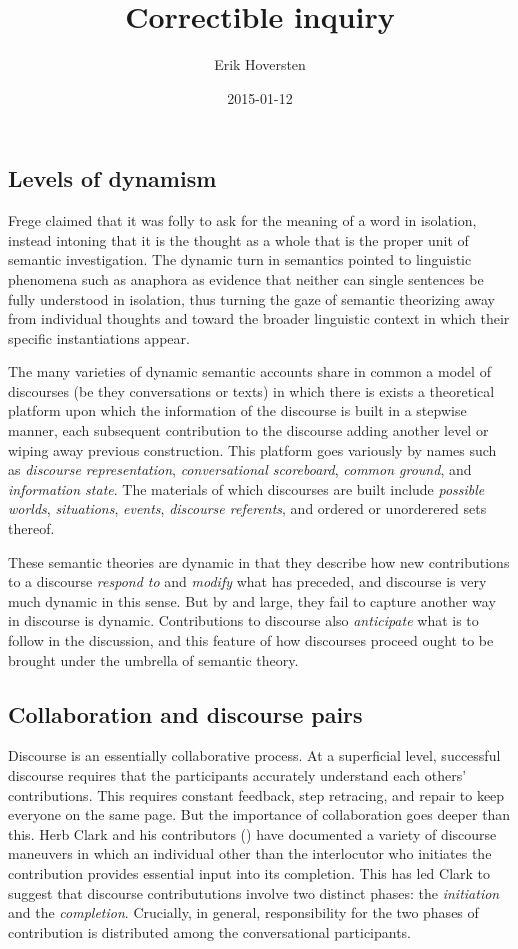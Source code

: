 \documentclass[letterpaper,]{article}
\title{Correctible inquiry}
\author{Erik Hoversten}
\date{2015-01-12}
\begin{document}
\subsection{Levels of dynamism}\label{levels-of-dynamism}

Frege claimed that it was folly to ask for the meaning of a word in
isolation, instead intoning that it is the thought as a whole that is
the proper unit of semantic investigation. The dynamic turn in semantics
pointed to linguistic phenomena such as anaphora as evidence that
neither can single sentences be fully understood in isolation, thus
turning the gaze of semantic theorizing away from individual thoughts
and toward the broader linguistic context in which their specific
instantiations appear.

The many varieties of dynamic semantic accounts share in common a model
of discourses (be they conversations or texts) in which there is exists
a theoretical platform upon which the information of the discourse is
built in a stepwise manner, each subsequent contribution to the
discourse adding another level or wiping away previous construction.
This platform goes variously by names such as \emph{discourse
representation}, \emph{conversational scoreboard}, \emph{common ground},
and \emph{information state}. The materials of which discourses are
built include \emph{possible worlds}, \emph{situations}, \emph{events},
\emph{discourse referents}, and ordered or unorderered sets thereof.

These semantic theories are dynamic in that they describe how new
contributions to a discourse \emph{respond to} and \emph{modify} what
has preceded, and discourse is very much dynamic in this sense. But by
and large, they fail to capture another way in discourse is dynamic.
Contributions to discourse also \emph{anticipate} what is to follow in
the discussion, and this feature of how discourses proceed ought to be
brought under the umbrella of semantic theory.

\subsection{Collaboration and discourse
pairs}\label{collaboration-and-discourse-pairs}

Discourse is an essentially collaborative process. At a superficial
level, successful discourse requires that the participants accurately
understand each others' contributions. This requires constant feedback,
step retracing, and repair to keep everyone on the same page. But the
importance of collaboration goes deeper than this. Herb Clark and his
contributors (\textcite{clark1992}) have documented a variety of
discourse maneuvers in which an individual other than the interlocutor
who initiates the contribution provides essential input into its
completion. This has led Clark to suggest that discourse contribututions
involve two distinct phases: the \emph{initiation} and the
\emph{completion}. Crucially, in general, responsibility for the two
phases of contribution is distributed among the conversational
participants.
\end{document}
